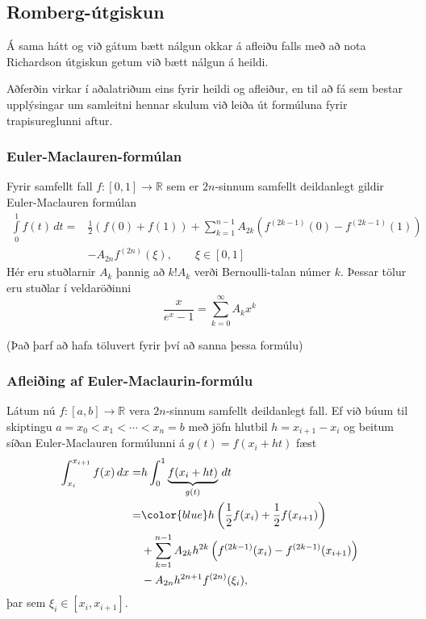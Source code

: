 \documentclass[icelandic,a4paper,12pt]{article}
\begin{document}
\subsection{Romberg-útgiskun} 
Á sama hátt og við gátum bætt nálgun okkar á afleiðu falls með að nota
Richardson útgiskun getum við bætt nálgun á heildi. 

\pause
\smallskip
Aðferðin virkar í
aðalatriðum eins fyrir heildi og afleiður, en til að fá sem bestar
upplýsingar um samleitni hennar skulum við leiða út formúluna fyrir
trapisureglunni aftur. 



\subsubsection{Euler-Maclauren-formúlan} 
Fyrir samfellt fall $f : [0,1] \to \mathbb R$ sem er $2n$-sinnum
samfellt deildanlegt gildir Euler-Maclauren formúlan 
\begin{align*}
  \int\limits_0^1 f(t) \, dt 
  =&  \frac{1}{2}\left( f(0) + f(1) \right) 
  + \sum\limits_{k=1}^{n-1} A_{2k}
  \left( f^{(2k-1)}(0) - f^{(2k-1)}(1)\right) \\
  & - A_{2n}f^{(2n)}(\xi), \qquad \xi \in [0,1]
\end{align*}
\pause
Hér eru stuðlarnir $A_k$ þannig að $k!A_k$ verði Bernoulli-talan númer
$k$. Þessar tölur eru stuðlar í veldaröðinni 
\begin{equation*}
  \frac{x}{e^x -1} = \sum\limits_{k=0}^{\infty}A_kx^k
\end{equation*}

\pause
(Það þarf að hafa töluvert fyrir því að sanna þessa formúlu)



\subsubsection{Afleiðing af Euler-Maclaurin-formúlu}
Látum nú $f : [a,b] \to \mathbb R$ vera $2n$-sinnum samfellt
deildanlegt fall. \pause
Ef við búum til skiptingu $a= x_0 < x_1 < \cdots <
x_n = b$ með jöfn hlutbil $h = x_{i+1} - x_i$ og beitum síðan
Euler-Maclauren formúlunni á $g(t) = f(x_i + ht)$ fæst 
\begin{align*}
   \int_{x_i}^{x_{i+1}} f(x)\,dx 
  = & h\int_0^1 \underbrace{f(x_i + ht)}_{g(t)}\,dt \\
  = & {\color{blue} h \left( \frac{1}{2}f(x_i) + \frac{1}{2}f(x_{i+1})\right) }\\
   & +    \sum_{k=1}^{n-1}A_{2k}h^{2k}\left( f^{(2k-1)}(x_i) -
    f^{(2k-1)}(x_{i+1}) \right) \\
    & - A_{2n}h^{2n+1}f^{(2n)}(\xi_i), 
\end{align*}
þar sem $\xi_i \in [x_i, x_{i+1}]$.
\end{document}
